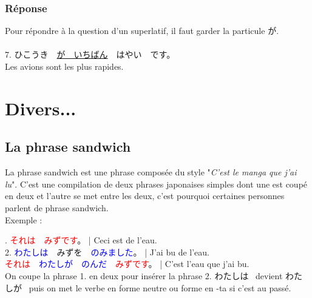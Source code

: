 \documentclass[11pt]{report}
\newenvironment{Japanese}{%
\CJKfamily{min}%
\CJKtilde  
\CJKnospace}{}
\begin{document}
\subsection{Réponse}

\begin{CJK}{UTF8}{}  
\begin{Japanese}
	Pour répondre \`a la question d'un superlatif, il faut garder la particule が. \\ \\
	7. ひこうき　\underline{が　いちばん}　はやい　です。 \\
	Les avions sont les plus rapides.
	
\end{Japanese}  
\end{CJK}

\chapter{Divers...}

\section{La phrase sandwich}

La phrase sandwich est une phrase composée du style "\textit{C'est le manga que j'ai lu}". C'est une compilation de deux phrases japonaises simples dont une est coupé en deux et l'autre se met entre les deux, c'est pourquoi certaines personnes parlent de phrase sandwich. \\

Exemple : \\

\begin{CJK}{UTF8}{}  
\begin{Japanese}
	
. \textcolor{red}{それは　みずです}。 | Ceci est de l'eau. \\
2. \textcolor{blue}{わたしは}　みずを　\textcolor{blue}{のみました}。 | J'ai bu de l'eau. \\

\noindent \textcolor{red}{それは}　\textcolor{blue}{わたしが　のんだ}　\textcolor{red}{みずです}。 | C'est l'eau que j'ai bu. \\

\noindent On coupe la phrase 1. en deux pour insérer la phrase 2. わたしは \, devient わたしが \, puis on met le verbe en forme neutre ou forme en -ta si c'est au passé.
	
\end{Japanese}  
\end{CJK}
\end{document}

